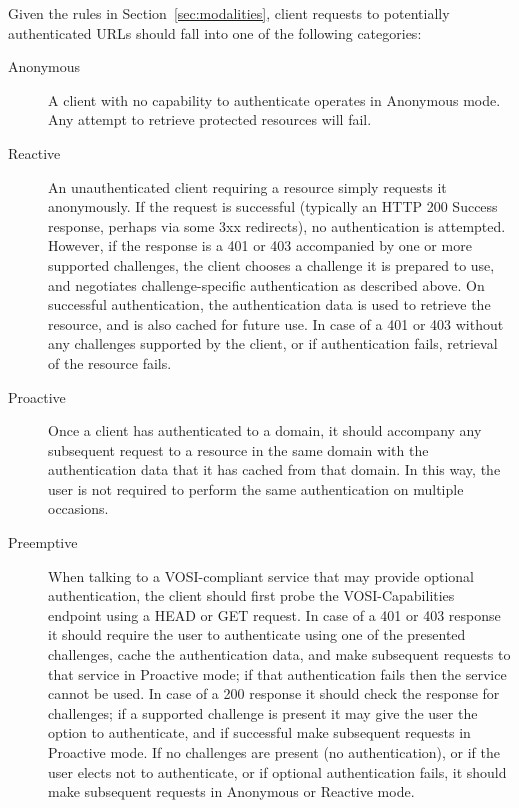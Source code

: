 \documentclass[11pt,a4paper]{ivoa}
\begin{document}
Given the rules in Section~\ref{sec:modalities},
client requests to potentially authenticated URLs should
fall into one of the following categories:
\begin{description}
\item[Anonymous]
      A client with no capability to authenticate operates in Anonymous mode.
      Any attempt to retrieve protected resources will fail.
\item[Reactive]
      An unauthenticated client requiring a
      resource simply requests it anonymously.
      If the request is successful
      (typically an HTTP 200 Success response, perhaps via some 3xx redirects),
      no authentication is attempted.
      However, if the response is a 401 or 403 accompanied by
      one or more supported challenges,
      the client chooses a challenge it is prepared to use,
      and negotiates challenge-specific authentication as described above.
      On successful authentication, the authentication data is used to
      retrieve the resource, and is also cached for future use.
      In case of a 401 or 403 without any challenges supported by the client,
      or if authentication fails, retrieval of the resource fails.
\item[Proactive]
      Once a client has authenticated to a domain,
      it should accompany any subsequent request to a resource
      in the same domain
      with the authentication data that it has cached from that domain.
      In this way, the user is not required to perform the same
      authentication on multiple occasions.
\item[Preemptive]
      When talking to a VOSI-compliant service that may provide
      optional authentication,
      the client should first probe the VOSI-Capabilities endpoint
      using a HEAD or GET request.
      In case of a 401 or 403 response
      it should require the user to authenticate
      using one of the presented challenges,
      cache the authentication data, and make subsequent requests
      to that service in Proactive mode;
      if that authentication fails then the service cannot be used.
      In case of a 200 response it should check the response for challenges;
      if a supported challenge is present it may give the user the
      option to authenticate, and if successful make subsequent requests
      in Proactive mode.
      If no challenges are present (no authentication),
      or if the user elects not to authenticate,
      or if optional authentication fails,
      it should make subsequent requests in Anonymous or Reactive mode.
\end{description}
\end{document}
